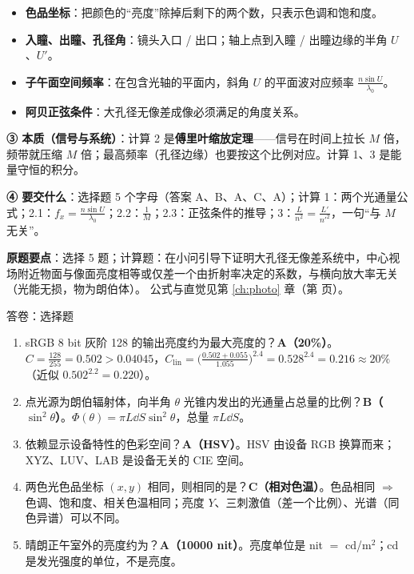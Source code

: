 \begin{idea}[读题：这道题在说什么]
\begin{itemize}
\item \textbf{色品坐标}：把颜色的“亮度”除掉后剩下的两个数，只表示色调和饱和度。
\item \textbf{入瞳、出瞳、孔径角}：镜头入口 / 出口；轴上点到入瞳 / 出瞳边缘的半角 $U$、$U'$。
\item \textbf{子午面空间频率}：在包含光轴的平面内，斜角 $U$ 的平面波对应频率 $\frac{n\sin U}{\lambda_0}$。
\item \textbf{阿贝正弦条件}：大孔径无像差成像必须满足的角度关系。
\end{itemize}
\textbf{③ 本质（信号与系统）}：计算 2 是\textbf{傅里叶缩放定理}——信号在时间上拉长 $M$ 倍，频带就压缩 $M$ 倍；最高频率（孔径边缘）也要按这个比例对应。计算 1、3 是能量守恒的积分。

\textbf{④ 要交什么}：选择题 5 个字母（答案 A、B、A、C、A）；计算 1：两个光通量公式；2.1：$f_x=\frac{n\sin U}{\lambda_0}$；2.2：$\frac1M$；2.3：正弦条件的推导；3：$\frac{L}{n^2}=\frac{L'}{n'^2}$，一句“与 $M$ 无关”。
\end{idea}

\noindent\textbf{原题要点}：选择 5 题；计算题：在小问引导下证明大孔径无像差系统中，中心视场附近物面与像面亮度相等或仅差一个由折射率决定的系数，与横向放大率无关（光能无损，物为朗伯体）。
公式与直觉见第 \ref{ch:photo} 章（第 \pageref{ch:photo} 页）。

\begin{exam}{答卷：选择题}
\begin{enumerate}
\item sRGB 8 bit 灰阶 128 的输出亮度约为最大亮度的？\quad\textbf{A（20\%）}。
$C=\frac{128}{255}=0.502>0.04045$，$C_{\text{lin}}=\big(\frac{0.502+0.055}{1.055}\big)^{2.4}=0.528^{2.4}=0.216\approx20\%$（近似 $0.502^{2.2}=0.220$）。
\item 点光源为朗伯辐射体，向半角 $\theta$ 光锥内发出的光通量占总量的比例？\quad\textbf{B（$\sin^2\theta$）}。$\Phi(\theta)=\pi L\dd S\sin^2\theta$，总量 $\pi L\dd S$。
\item 依赖显示设备特性的色彩空间？\quad\textbf{A（HSV）}。HSV 由设备 RGB 换算而来；XYZ、LUV、LAB 是设备无关的 CIE 空间。
\item 两色光色品坐标 $(x,y)$ 相同，则相同的是？\quad\textbf{C（相对色温）}。色品相同 $\Rightarrow$ 色调、饱和度、相关色温相同；亮度 $Y$、三刺激值（差一个比例）、光谱（同色异谱）可以不同。
\item 晴朗正午室外的亮度约为？\quad\textbf{A（10000 nit）}。亮度单位是 nit $=$ cd/m$^2$；cd 是发光强度的单位，不是亮度。
\end{enumerate}
\end{exam}

